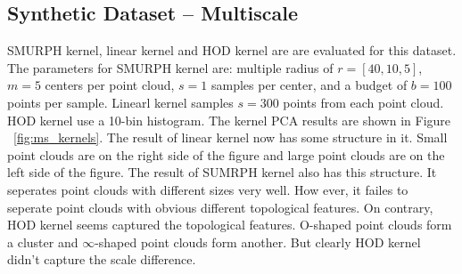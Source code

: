 \documentclass[10pt]{article}
\begin{document}
\subsection{Synthetic Dataset -- Multiscale}

SMURPH kernel, linear kernel and HOD kernel are are evaluated for this dataset.
The parameters for SMURPH kernel are:  multiple radius of $r = [40,10,5]$, $m = 5$ centers per point cloud, $s = 1$ samples per center, and a budget of $b = 100$ points per sample.
Linearl kernel samples $s=300$ points from each point cloud.
HOD kernel use a 10-bin histogram.
The kernel PCA results are shown in Figure ~\ref{fig:ms_kernels}.
The result of linear kernel now has some structure in it.
Small point clouds are on the right side of the figure and large point clouds are on the left side of the figure.
The result of SUMRPH kernel also has this structure.
It seperates point clouds with different sizes very well.
How ever, it failes to seperate point clouds with obvious different topological features.
On contrary, HOD kernel seems captured the topological features.
O-shaped point clouds form a cluster and $\infty$-shaped point clouds form another.
But clearly HOD kernel didn't capture the scale difference.
\end{document}

